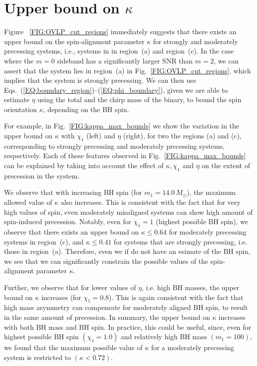 \section{Upper bound on $\kappa$}

Figure ~\ref{FIG:OVLP_cut_regions} immediately suggests that there exists an
upper bound on the spin-alignment parameter $\kappa$ for strongly and
moderately precessing systems, i.e., systems in in region~(a) and region~(c).
In the case where the $m=0$ sideband has a significantly larger SNR than
$m=2$, we can assert that the system lies in region~(a) in
Fig.~\ref{FIG:OVLP_cut_regions}, which implies that the system is strongly
precessing. We can then use
Eqs.~(\ref{EQ:boundary_region})--(\ref{EQ:phi_boundary}), given we are able to
estimate $\eta$ using the total and the chirp mass of the binary, to bound the
spin orientation $\kappa$, depending on the BH spin.


For example, in Fig.~\ref{FIG:kappa_max_bounds} we show the variation in the
upper bound on $\kappa$ with $\chi_1$ (left) and $\eta$ (right), for two the
regions (a) and (c), corresponding to strongly precessing and moderately
precessing systems, respectively. Each of these features observed in
Fig.~\ref{FIG:kappa_max_bounds} can be explained by taking into account the
effect of $\kappa, \chi_1$ and $\eta$ on the extent of precession in the
system.

We observe that with increasing BH spin (for $m_1=14.0\,M_{\odot}$), the
maximum allowed value of $\kappa$ also increases. This is consistent with the
fact that for very high values of spin, even moderately misaligned systems can
show high amount of spin-induced precession. Notably, even for $\chi_1=1$
(highest possible BH spin), we observe that there exists an upper bound on
$\kappa \leq 0.64$ for moderately precessing systems in region~(c), and
$\kappa \leq 0.41$ for systems that are strongly precessing, i.e. those in
region~(a). Therefore, even we if do not have an esimate of the BH spin, we
see that we can significantly constrain the possible values of the spin-
alignment parameter $\kappa$.

Further, we observe that for lower values of $\eta$, i.e. high BH masses, the
upper bound on $\kappa$ increases (for $\chi_1=0.8$). This is again consistent
with the fact that high mass asymmetry can compensate for moderately aligned
BH spin, to result in the same amount of precession. In summary, the upper
bound on $\kappa$ increases with both BH mass and BH spin. In practice, this
could be useful, since, even for highest possible BH spin $(\chi_1=1.0)$ and
relatively high BH mass $(m_1=100)$, we found that the maximum possible value
of $\kappa$ for a moderately precessing system is restricted to $(\kappa <
0.72)$.

